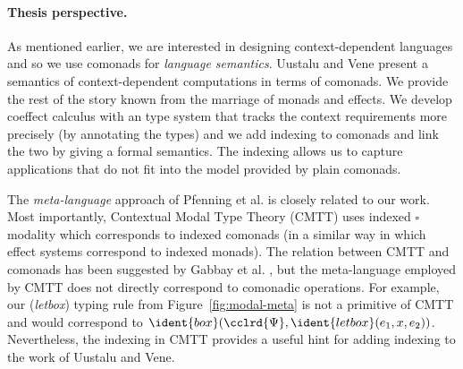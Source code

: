 
\paragraph{Thesis perspective.}
As mentioned earlier, we are interested in designing context-dependent languages and so we
use comonads for \emph{language semantics}. Uustalu and Vene present a semantics of
context-dependent computations in terms of comonads. We provide the rest of the story known
from the marriage of monads and effects. We develop coeffect calculus with an type system that
tracks the context requirements more precisely (by annotating the types) and we add indexing
to comonads and link the two by giving a formal semantics. The indexing allows us to capture
applications that do not fit into the model provided by plain comonads.

The \emph{meta-language} approach of Pfenning et al. is closely related to
our work. Most importantly, Contextual Modal Type Theory (CMTT) uses indexed $\square$ modality
which corresponds to indexed comonads (in a similar way in which effect systems correspond to
indexed monads). The relation between CMTT and comonads has been suggested by
Gabbay et al. \cite{logic-cmtt-semantics}, but the meta-language employed by CMTT does not
directly correspond to comonadic operations. For example, our (\emph{letbox}) typing rule from
Figure~\ref{fig:modal-meta} is not a primitive of CMTT and would correspond to
$\ident{box}(\cclrd{\Psi}, \ident{letbox}(e_1, x, e_2))$. Nevertheless, the indexing in
CMTT provides a useful hint for adding indexing to the work of Uustalu and Vene.


%
%

